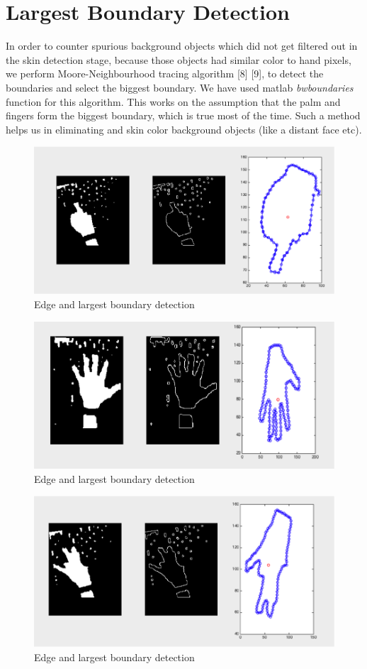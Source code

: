 \documentclass{acm} %
\begin{document}
\section{Largest Boundary Detection}
In order to counter spurious background objects which did not get filtered out in the skin detection stage, because those objects had similar color to hand pixels, we perform Moore-Neighbourhood tracing algorithm [8] [9], to detect the boundaries and select the biggest boundary. We have used matlab \textit{bwboundaries} function for this algorithm. This works on the assumption that the palm and fingers form the biggest boundary, which is true most of the time. Such a method helps us in eliminating and skin color background objects (like a distant face etc).
\begin{figure}[h]
\centering
\includegraphics[width=3 in]{largest_boundary1}
\caption{Edge and largest boundary detection}
\label{fig:fig9}
\end{figure}

\begin{figure}[h]
\centering
\includegraphics[width=3 in]{largest_boundary2}
\caption{Edge and largest boundary detection}
\label{fig:fig10}
\end{figure}

\begin{figure}[h]
\centering
\includegraphics[width=3 in]{largest_boundary3}
\caption{Edge and largest boundary detection}
\label{fig:fig11}
\end{figure}
\end{document}
